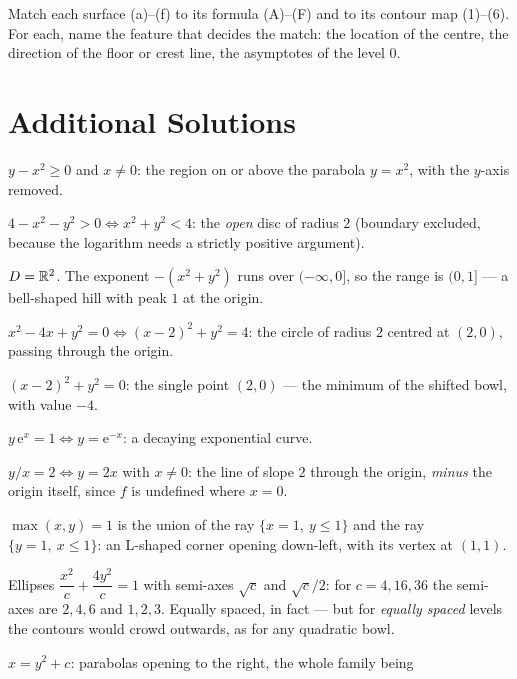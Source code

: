 \begin{problems}[resume]
  \item Match each surface (a)--(f) to its formula (A)--(F) and to its
        contour map (1)--(6). For each, name the feature that decides the
        match: the location of the centre, the direction of the floor or
        crest line, the asymptotes of the level $0$.
\end{problems}

\section{Additional Solutions}

\begin{solutions}
  \item $y-x^{2}\ge0$ and $x\neq0$: the region on or above the parabola
        $y=x^{2}$, with the $y$-axis removed.
  \item $4-x^{2}-y^{2}>0\iff x^{2}+y^{2}<4$: the \emph{open} disc of
        radius $2$ (boundary excluded, because the logarithm needs a
        strictly positive argument).
  \item $D=\mathbb{R}^{2}$. The exponent $-(x^{2}+y^{2})$ runs over $(-\infty,0]$,
        so the range is $(0,1]$ --- a bell-shaped hill with peak $1$ at the
        origin.
  \item $x^{2}-4x+y^{2}=0\iff(x-2)^{2}+y^{2}=4$: the circle of radius $2$
        centred at $(2,0)$, passing through the origin.
  \item $(x-2)^{2}+y^{2}=0$: the single point $(2,0)$ --- the minimum of
        the shifted bowl, with value $-4$.
  \item $y\,\mathrm{e}^{x}=1\iff y=\mathrm{e}^{-x}$: a decaying
        exponential curve.
  \item $y/x=2\iff y=2x$ with $x\neq0$: the line of slope $2$ through the
        origin, \emph{minus} the origin itself, since $f$ is undefined
        where $x=0$.
  \item $\max(x,y)=1$ is the union of the ray $\{x=1,\ y\le1\}$ and the ray
        $\{y=1,\ x\le1\}$: an L-shaped corner opening down-left, with its
        vertex at $(1,1)$.
  \item Ellipses $\dfrac{x^{2}}{c}+\dfrac{4y^{2}}{c}=1$ with semi-axes
        $\sqrt{c}$ and $\sqrt{c}/2$: for $c=4,16,36$ the semi-axes are
        $2,4,6$ and $1,2,3$. Equally spaced, in fact --- but for
        \emph{equally spaced} levels the contours would crowd outwards, as
        for any quadratic bowl.
  \item $x=y^{2}+c$: parabolas opening to the right, the whole family being

\end{solutions}
